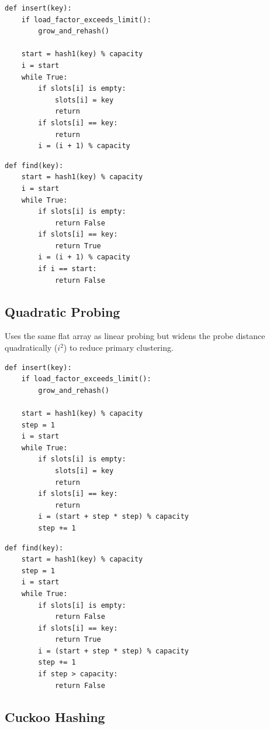 \documentclass[11pt,a4paper]{article}
\begin{document}
\begin{lstlisting}[style=pseudocode, caption={Linear Probing -- insert}]
def insert(key):
    if load_factor_exceeds_limit():
        grow_and_rehash()

    start = hash1(key) % capacity
    i = start
    while True:
        if slots[i] is empty:
            slots[i] = key
            return
        if slots[i] == key:
            return
        i = (i + 1) % capacity
\end{lstlisting}

\begin{lstlisting}[style=pseudocode, caption={Linear Probing -- find}]
def find(key):
    start = hash1(key) % capacity
    i = start
    while True:
        if slots[i] is empty:
            return False
        if slots[i] == key:
            return True
        i = (i + 1) % capacity
        if i == start:
            return False
\end{lstlisting}

\subsection{Quadratic Probing}

Uses the same flat array as linear probing but widens the probe distance quadratically
($i^2$) to reduce primary clustering.

\begin{lstlisting}[style=pseudocode, caption={Quadratic Probing -- insert}]
def insert(key):
    if load_factor_exceeds_limit():
        grow_and_rehash()

    start = hash1(key) % capacity
    step = 1
    i = start
    while True:
        if slots[i] is empty:
            slots[i] = key
            return
        if slots[i] == key:
            return
        i = (start + step * step) % capacity
        step += 1
\end{lstlisting}

\begin{lstlisting}[style=pseudocode, caption={Quadratic Probing -- find}]
def find(key):
    start = hash1(key) % capacity
    step = 1
    i = start
    while True:
        if slots[i] is empty:
            return False
        if slots[i] == key:
            return True
        i = (start + step * step) % capacity
        step += 1
        if step > capacity:
            return False
\end{lstlisting}

\subsection{Cuckoo Hashing}
\end{document}
